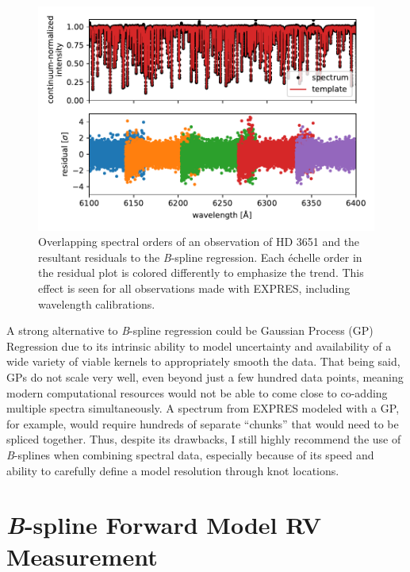 \begin{figure}
    \centering
    \includegraphics[width=\textwidth]{figures-5/order-matching.pdf}
    \caption[Stellar template overlapping orders]{Overlapping spectral orders of an observation of HD 3651 and the resultant residuals to the \textit{B}-spline regression. Each \'{e}chelle order in the residual plot is colored differently to emphasize the trend. This effect is seen for all observations made with EXPRES, including wavelength calibrations.}
    \label{fig:order-matching}
\end{figure}

A strong alternative to \textit{B}-spline regression could be Gaussian Process (GP) Regression \citep{rajpaul_robust_2020} due to its intrinsic ability to model uncertainty and availability of a wide variety of viable kernels to appropriately smooth the data. That being said, GPs do not scale very well, even beyond just a few hundred data points, meaning modern computational resources would not be able to come close to co-adding multiple spectra simultaneously. A spectrum from EXPRES modeled with a GP, for example, would require hundreds of separate ``chunks'' that would need to be spliced together. Thus, despite its drawbacks, I still highly recommend the use of \textit{B}-splines when combining spectral data, especially because of its speed and ability to carefully define a model resolution through knot locations.

\section{\textit{B}-spline Forward Model RV Measurement} \label{pipeline2:forward-model}


